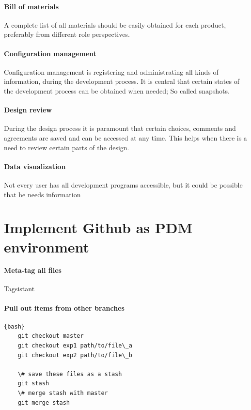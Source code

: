 \documentclass[fleqn,10pt]{SelfArx} %
\begin{document}
\paragraph{Bill of materials}
A complete list of all materials should be easily obtained for each product, preferably from different role perspectives.

\paragraph{Configuration management}
Configuration management is registering and administrating all kinds of information, during the development process. It is central that certain states of the development process can be obtained when needed; So called snapshots.

\paragraph{Design review}
During the design process it is paramount that certain choices, comments and agreements are saved and can be accessed at any time. This helps when there is a need to review certain parts of the design.

\paragraph{Data visualization}
Not every user has all development programs accessible, but it could be possible that he needs information 
 
\section{Implement Github as PDM environment}

\paragraph{Meta-tag all files}

\href{https://www.tagsistant.net/}{\color{color1}Tagsistant}

\paragraph{Pull out items from other branches}
\begin{lstlisting}{bash}
	git checkout master
	git checkout exp1 path/to/file\_a
	git checkout exp2 path/to/file\_b
	
	\# save these files as a stash
	git stash
	\# merge stash with master
	git merge stash
\end{lstlisting}
\end{document}
